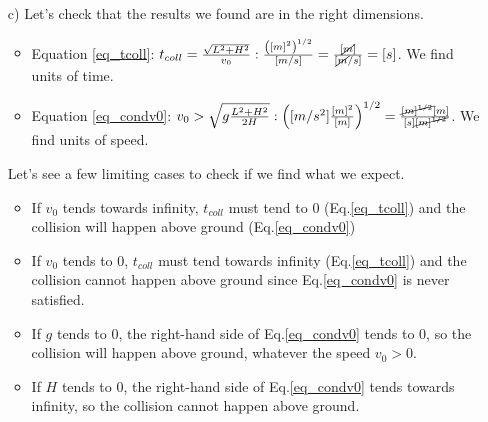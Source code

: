 \begin{enumerate}
\item[c)]
Let's check that the results we found are in the right dimensions.
\begin{itemize}
\item Equation \ref{eq_tcoll}: $t_{coll}=\frac{\sqrt{L^2+H^2}}{v_0}:\frac{\left([m]^2\right)^{1/2}}{[m/s]}=\frac{[\cancel{m}]}{[\cancel{m}/s]}=[s]$. We find units of time.
\item Equation \ref{eq_condv0}: $v_0 > \sqrt{g\frac{L^2+H^2}{2H}}:\left([m/s^2]\frac{[m]^2}{[m]}\right)^{1/2}=\frac{\cancel{[m]^{1/2}}[m]}{[s]\cancel{[m]^{1/2}}}$. We find units of speed.
\end{itemize}
Let's see a few limiting cases to check if we find what we expect.
\begin{itemize}
\item If $v_0$ tends towards infinity, $t_{coll}$ must tend to 0 (Eq.\ref{eq_tcoll}) and the collision will happen above ground (Eq.\ref{eq_condv0})
\item If $v_0$ tends to 0, $t_{coll}$ must tend towards infinity (Eq.\ref{eq_tcoll}) and the collision cannot happen above ground since Eq.\ref{eq_condv0} is never satisfied.
\item If $g$ tends to 0, the right-hand side of Eq.\ref{eq_condv0} tends to 0, so the collision will happen above ground, whatever the speed $v_0>0$. 
\item If $H$ tends to 0, the right-hand side of Eq.\ref{eq_condv0} tends towards infinity, so the collision cannot happen above ground. 

\end{itemize}

\end{enumerate}



